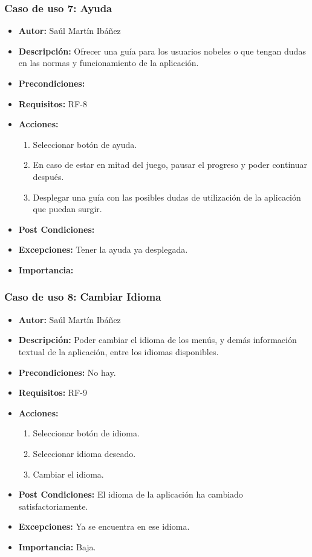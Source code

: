 \subsubsection{Caso de uso 7: Ayuda}
\begin{itemize}
	\item \textbf{Autor:} Saúl Martín Ibáñez
	\item \textbf{Descripción:} Ofrecer una guía para los usuarios nobeles o que tengan dudas en las normas y funcionamiento de la aplicación.
	\item \textbf{Precondiciones:}
	\item \textbf{Requisitos:} RF-8
	\item \textbf{Acciones:}
	\begin{enumerate}
		\item Seleccionar botón de ayuda.
		\item En caso de estar en mitad del juego, pausar el progreso y poder continuar después.
		\item Desplegar una guía con las posibles dudas de utilización de la aplicación que puedan surgir.
	\end{enumerate}
	\item \textbf{Post Condiciones:}
	\item \textbf{Excepciones:} Tener la ayuda ya desplegada.
	\item \textbf{Importancia:} 
\end{itemize}
\subsubsection{Caso de uso 8: Cambiar Idioma}
\begin{itemize}
	\item \textbf{Autor:} Saúl Martín Ibáñez
	\item \textbf{Descripción:} Poder cambiar el idioma de los menús, y demás información textual de la aplicación, entre los idiomas disponibles.
	\item \textbf{Precondiciones:} No hay.
	\item \textbf{Requisitos:} RF-9
	\item \textbf{Acciones:}
	\begin{enumerate}
		\item Seleccionar botón de idioma.
		\item Seleccionar idioma deseado.
		\item Cambiar el idioma.
	\end{enumerate}
	\item \textbf{Post Condiciones:} El idioma de la aplicación ha cambiado satisfactoriamente.
	\item \textbf{Excepciones:} Ya se encuentra en ese idioma.
	\item \textbf{Importancia:} Baja.
\end{itemize}
